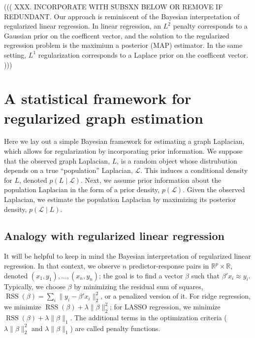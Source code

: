 \documentclass[12pt]{article}
\newcommand{\reals}{\mathbb{R}}
\DeclareMathOperator*{\RSS}{RSS}
\theoremstyle{plain}
\begin{document}
(((
XXX.  INCORPORATE WITH SUBSXN BELOW OR REMOVE IF REDUNDANT.
Our approach is reminiscent of the Bayesian interpretation of
regularized linear regression.  In linear regression, an $L^2$ penalty
corresponds to a Gaussian prior on the coefficent vector, and the
solution to the regularized regression problem is the maximium a
posterior (MAP) estimator.  In the same setting, $L^1$ regularization
corresponds to a Laplace prior on the coefficent vector.
)))


\section{A statistical framework for regularized graph estimation}
\label{snx:framework}

Here we lay out a simple Bayesian framework for estimating a graph
Laplacian, which allows for regularization by incorporating prior
information.  We suppose that the observed graph Laplacian, $L$, is a
random object whose distrubution depends on a true ``population''
Laplacian, $\mathcal{L}$.  This induces a conditional density for $L$,
denoted $p(L \mid \mathcal{L})$.  Next, we assume prior information
about the population Laplacian in the form of a prior density,
$p(\mathcal{L})$.  Given the observed Laplacian, we estimate the
population Laplacian by maximizing its posterior density,
$p(\mathcal{L} \mid L)$.


\subsection{Analogy with regularized linear regression}\label{S:regression}

It will be helpful to keep in mind the Bayesian
interpretation of regularized linear regression.  In that context, we
observe $n$ predictor-response pairs in $\reals^p \times \reals$,
denoted $(x_1, y_1), \dotsc, (x_n, y_n)$; the goal is to find a vector
$\beta$ such that $\beta' x_i \approx y_i$.  Typically, we choose
$\beta$ by minimizing the residual sum of squares,
$\RSS(\beta) = \sum_i \| y_i - \beta' x_i \|_2^2$, or a
penalized version of it.  For ridge regression, we minimize
$\RSS(\beta) + \lambda \|\beta\|_2^2$; for LASSO regression, we minimize
$\RSS(\beta) + \lambda \|\beta\|_1$.  The additional terms in the
optimization criteria ($\lambda \|\beta\|_2^2$ and $\lambda
\|\beta\|_1$) are called penalty functions.
\end{document}
